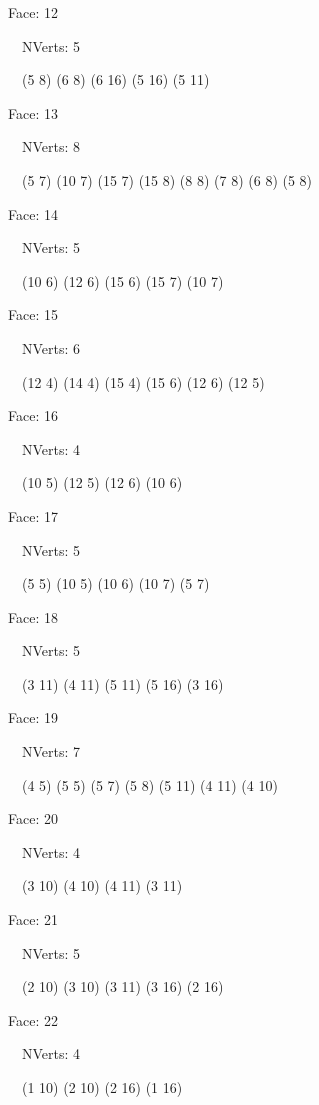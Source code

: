 \documentclass{article}
\begin{document}
{\footnotesize 

Face: 12

\   \    NVerts: 5

 \   \   (5 8) (6 8) (6 16) (5 16) (5 11)}

{\footnotesize 

Face: 13

\   \    NVerts: 8

 \   \   (5 7) (10 7) (15 7) (15 8) (8 8) (7 8) (6 8) (5 8)}

{\footnotesize 

Face: 14

\   \    NVerts: 5

 \   \   (10 6) (12 6) (15 6) (15 7) (10 7)}

{\footnotesize 

Face: 15

\   \    NVerts: 6

 \   \   (12 4) (14 4) (15 4) (15 6) (12 6) (12 5)}

{\footnotesize 

Face: 16

\   \    NVerts: 4

 \   \   (10 5) (12 5) (12 6) (10 6)}

{\footnotesize 

Face: 17

\   \    NVerts: 5

 \   \   (5 5) (10 5) (10 6) (10 7) (5 7)}

{\footnotesize 

Face: 18

\   \    NVerts: 5

 \   \   (3 11) (4 11) (5 11) (5 16) (3 16)}

{\footnotesize 

Face: 19

\   \    NVerts: 7

 \   \   (4 5) (5 5) (5 7) (5 8) (5 11) (4 11) (4 10)}

{\footnotesize 

Face: 20

\   \    NVerts: 4

 \   \   (3 10) (4 10) (4 11) (3 11)}

{\footnotesize 

Face: 21

\   \    NVerts: 5

 \   \   (2 10) (3 10) (3 11) (3 16) (2 16)}

{\footnotesize 

Face: 22

\   \    NVerts: 4

 \   \   (1 10) (2 10) (2 16) (1 16)}
\end{document}
